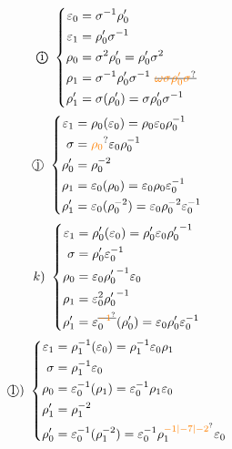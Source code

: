 \[\text{\textcircled{\textcircled{i}}}\ \left\{\begin{aligned}
\varepsilon_0&=\sigma^{-1}\rho'_0\\
\varepsilon_1&=\rho'_0\sigma^{-1}\\
\rho_0&=\sigma^2\rho'_0=\rho'_0\sigma^2\\
\rho_1&=\sigma^{-1}\rho'_0\sigma^{-1}\ \deleted{\unsure{\omega\sigma\rho'_0\sigma}}\\
\rho'_1&=\sigma(\rho'_0)=\sigma\rho'_0\sigma^{-1}
\end{aligned}\right.\]
\[\text{\textcircled{j}}\ \left\{\begin{aligned}
\varepsilon_1&=\rho_0(\varepsilon_0)=\rho_0\varepsilon_0\rho_0^{-1}\\
\sigma&=\unsure{\rho_0}\varepsilon_0\rho_0^{-1}\\
\rho'_0&=\rho_0^{-2}\\
\rho_1&=\varepsilon_0(\rho_0)=\varepsilon_0\rho_0\varepsilon_0^{-1}\\
\rho'_1&=\varepsilon_0(\rho_0^{-2})=\varepsilon_0\rho_0^{-2}\varepsilon_0^{-1}
\end{aligned}\right.\]
\[k)\ \left\{\begin{aligned}
\varepsilon_1&=\rho'_0(\varepsilon_0)=\rho'_0\varepsilon_0{\rho'_0}^{-1}\\
\sigma&=\rho'_0\varepsilon_0^{-1}\\
\rho_0&=\varepsilon_0{\rho'_0}^{-1}\varepsilon_0\\
\rho_1&=\varepsilon_0^2{\rho'_0}^{-1}\\
\rho'_1&=\varepsilon_0^{\deleted{\unsure{-1}}}(\rho'_0)=\varepsilon_0\rho'_0\varepsilon_0^{-1}
\end{aligned}\right.\]
\[\text{\textcircled{l})}\ \left\{\begin{aligned}
\varepsilon_1&=\rho_1^{-1}(\varepsilon_0)=\rho_1^{-1}\varepsilon_0\rho_1\\
\sigma&=\rho_1^{-1}\varepsilon_0\\
\rho_0&=\varepsilon_0^{-1}(\rho_1)=\varepsilon_0^{-1}\rho_1\varepsilon_0\\
\rho'_1&=\rho_1^{-2}\\
\rho'_0&=\varepsilon_0^{-1}(\rho_1^{-2})=\varepsilon_0^{-1}\rho_1^{\unsure{-1|-7|-2}}\varepsilon_0
\end{aligned}\right.\]
